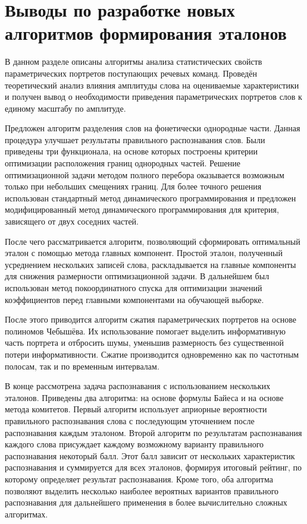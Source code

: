 
\section{Выводы по разработке новых алгоритмов формирования эталонов} \label{sect2_6}

В данном разделе описаны алгоритмы анализа статистических свойств параметрических портретов поступающих речевых команд.
Проведён теоретический анализ влияния амплитуды слова на оцениваемые характеристики и получен вывод о необходимости приведения параметрических портретов слов к единому масштабу по амплитуде.

Предложен алгоритм разделения слов на фонетически однородные части.
Данная процедура улучшает результаты правильного распознавания слов.
Были приведены три функционала, на основе которых построены критерии оптимизации расположения границ однородных частей.
Решение оптимизационной задачи методом полного перебора оказывается возможным только при небольших смещениях границ.
Для более точного решения использован стандартный метод динамического программирования и предложен модифицированный метод динамического программирования для критерия, зависящего от двух соседних частей.

После чего рассматривается алгоритм, позволяющий сформировать оптимальный эталон с помощью метода главных компонент.
Простой эталон, полученный усреднением нескольких записей слова, раскладывается на главные компоненты для снижения размерности оптимизационной задачи.
В дальнейшем был использован метод покоординатного спуска для оптимизации значений коэффициентов перед главными компонентами на обучающей выборке.

После этого приводится алгоритм сжатия параметрических портретов на основе полиномов Чебышёва.
Их использование помогает выделить информативную часть портрета и отбросить шумы, уменьшив размерность без существенной потери информативности.
Сжатие производится одновременно как по частотным полосам, так и по временным интервалам.

В конце рассмотрена задача распознавания с использованием нескольких эталонов.
Приведены два алгоритма: на основе формулы Байеса и на основе метода комитетов.
Первый алгоритм использует априорные вероятности правильного распознавания слова с последующим уточнением после распознавания каждым эталоном.
Второй алгоритм по результатам распознавания каждого слова присуждает каждому возможному варианту правильного распознавания некоторый балл.
Этот балл зависит от нескольких характеристик распознавания и суммируется для всех эталонов, формируя итоговый рейтинг, по которому определяет результат распознавания.
Кроме того, оба алгоритма позволяют выделить несколько наиболее вероятных вариантов правильного распознавания для дальнейшего применения в более вычислительно сложных алгоритмах.


\clearpage
